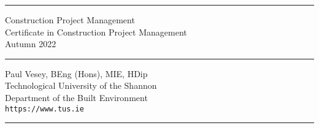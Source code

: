 
\thispagestyle{empty} %


\hrule

\vspace*{0.7cm} %


\begin{flushright}
\Huge Construction Project Management \\
\vspace*{0.7cm}
\Large Certificate in Construction Project Management\\
Autumn 2022
\end{flushright}

\vspace*{0.7cm} %
	
\normalsize

\hrule


\vfill %


{\centering \large 
\hfill Paul Vesey, \scriptsize BEng (Hons), MIE, HDip\normalsize \\
\hfill Technological University of the Shannon \\
\hfill Department of the Built Environment \\
\hfill \texttt{https://www.tus.ie} \\
\vspace*{0.7cm} 
\hrule} %


\clearpage %
